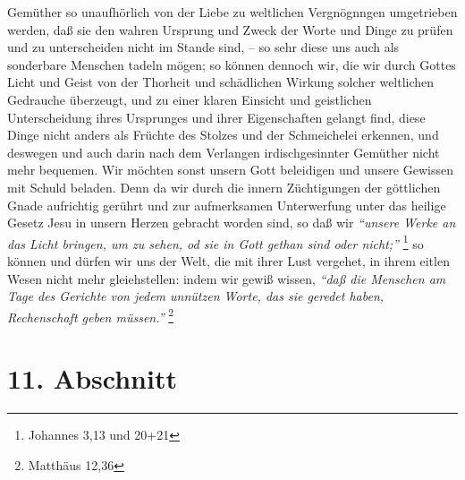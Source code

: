 Gemüther so unaufhörlich von der Liebe zu weltlichen Vergnögnngen umgetrieben
werden, daß sie den wahren Ursprung und Zweck der Worte und Dinge zu prüfen und
zu unterscheiden nicht im Stande sind, -- so sehr diese uns auch als sonderbare
Menschen tadeln mögen; so können dennoch wir, die wir durch Gottes Licht und
Geist von der Thorheit und schädlichen Wirkung solcher weltlichen Gedrauche
überzeugt, und zu einer klaren Einsicht und geistlichen Unterscheidung ihres
Ursprunges und ihrer Eigenschaften gelangt find, diese Dinge nicht anders als
Früchte des Stolzes und der Schmeichelei erkennen, und deswegen und auch darin
nach dem Verlangen irdischgesinnter Gemüther nicht mehr bequemen. Wir möchten
sonst unsern Gott beleidigen und unsere Gewissen mit Schuld beladen. Denn da wir
durch die innern Züchtigungen der göttlichen Gnade aufrichtig gerührt und zur
aufmerksamen Unterwerfung unter das heilige Gesetz Jesu in unsern Herzen
gebracht worden sind, so daß wir
\textit{"`unsere Werke an das Licht bringen, um zu
sehen, od sie in Gott gethan sind oder nicht;"'}
\footnote{Johannes 3,13 und 20+21}
so können und dürfen wir uns der Welt, die mit ihrer Lust vergehet, in ihrem eitlen
Wesen nicht mehr gleiehstellen: indem wir gewiß wissen,
\textit{"`daß die Menschen am
Tage des Gerichte von jedem unnützen Worte, das sie geredet haben, Rechenschaft
geben müssen."'}
\footnote{Matthäus 12,36}

\section{11. Abschnitt} \label{kap10_ab11}

